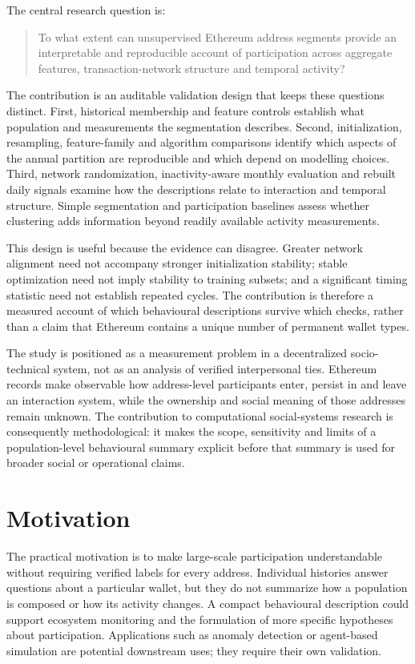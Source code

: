 \documentclass[journal,letterpaper]{IEEEtran}
\begin{document}
The central research question is:
\begin{quote}
To what extent can unsupervised Ethereum address segments provide an interpretable and reproducible account of participation across aggregate features, transaction-network structure and temporal activity?
\end{quote}

The contribution is an auditable validation design that keeps these questions distinct. First, historical membership and feature controls establish what population and measurements the segmentation describes. Second, initialization, resampling, feature-family and algorithm comparisons identify which aspects of the annual partition are reproducible and which depend on modelling choices. Third, network randomization, inactivity-aware monthly evaluation and rebuilt daily signals examine how the descriptions relate to interaction and temporal structure. Simple segmentation and participation baselines assess whether clustering adds information beyond readily available activity measurements.

This design is useful because the evidence can disagree. Greater network alignment need not accompany stronger initialization stability; stable optimization need not imply stability to training subsets; and a significant timing statistic need not establish repeated cycles. The contribution is therefore a measured account of which behavioural descriptions survive which checks, rather than a claim that Ethereum contains a unique number of permanent wallet types.

The study is positioned as a measurement problem in a decentralized socio-technical system, not as an analysis of verified interpersonal ties. Ethereum records make observable how address-level participants enter, persist in and leave an interaction system, while the ownership and social meaning of those addresses remain unknown. The contribution to computational social-systems research is consequently methodological: it makes the scope, sensitivity and limits of a population-level behavioural summary explicit before that summary is used for broader social or operational claims.

\section{Motivation}
The practical motivation is to make large-scale participation understandable without requiring verified labels for every address. Individual histories answer questions about a particular wallet, but they do not summarize how a population is composed or how its activity changes. A compact behavioural description could support ecosystem monitoring and the formulation of more specific hypotheses about participation. Applications such as anomaly detection or agent-based simulation are potential downstream uses; they require their own validation.
\end{document}
